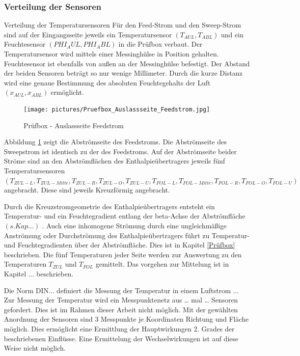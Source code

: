 \subsubsection{Verteilung der Sensoren}
\label{Verteilung der Sensoren}

Verteilung der Temperatursensoren
Für den Feed-Strom und den Sweep-Strom sind auf der Eingangsseite jeweils ein Temperatursensor $(T_{AUL}, T_{ABL})$ und ein Feuchtesensor $(PHI_AUL, PHI_ABL)$ in die Prüfbox verbaut. Der Temperatursensor wird mittels einer Messinghülse in Position gehalten. Feuchtesensor ist ebenfalls von außen an der Messinghülse befestigt. Der Abstand der beiden Sensoren beträgt so nur wenige Millimeter. Durch die kurze Distanz wird eine genaue Bestimmung des absoluten Feuchtegehalts der Luft $(x_{AUL}, x_{ABL})$ ermöglicht. 


\begin{figure} [h]
	\centering
	\texttt{[image: pictures/Pruefbox\_Auslassseite\_Feedstrom.jpg]}
	\caption{Prüfbox - Auslassseite Feedstrom}
	\label{fig:Prüfbox - Auslassseite Feedstrom}
\end{figure}

Abbildung \ref{fig:Prüfbox - Auslassseite Feedstrom} zeigt die Abströmseite des Feedstroms. Die Abströmseite des Sweepstrom ist identisch zu der des Feedstroms. Auf der Abströmseite beider Ströme sind an den Abströmflächen des Enthalpieübertragers jeweils fünf Temperatursensoren $(T_{ZUL-L}, T_{ZUL-Mitte}, T_{ZUL-R}, T_{ZUL-O}, T_{ZUL-U}, T_{FOL-L}, T_{FOL-Mitte}, T_{FOL-R}, T_{FOL-O}, T_{FOL-U})$ angebracht. Diese sind jeweils Kreuzförmig angebracht.

Durch die Kreuzstromgeometrie des Enthalpieübertragers entsteht ein Temperatur- und ein Feuchtegradient entlang der beta-Achse der Abströmfläche $(s.Kap...)$ . Auch eine inhomogene Strömung durch eine ungleichmäßige Anströmung oder Durchströmung des Enthalpieübertragers führt zu Temperatur- und Feuchtegradienten über der Abströmfläche. Dies ist in Kapitel \ref{Prüfbox} beschrieben. Die fünf Temperaturen jeder Seite werden zur Auswertung zu den Temperaturen $T_{ZUL}$ und $T_{FOL}$ gemittelt. Das vorgehen zur Mittelung ist in Kapitel ... beschrieben. 

Die Norm DIN... definiert die Messung der Temperatur in einem Luftstrom ...  Zur Messung der Temperatur wird ein Messpunktenetz aus … mal … Sensoren gefordert. Dies ist im Rahmen dieser Arbeit nicht möglich. Mit der gewählten Anordnung der Sensoren sind 3 Messpunkte je Koordinaten Richtung und Fläche möglich. Dies ermöglicht eine Ermittlung der Hauptwirkungen 2. Grades der beschriebenen Einflüsse. Eine Ermittelung der Wechselwirkungen ist auf diese Weise nicht möglich. 

